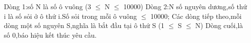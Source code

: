 Dòng 1:số N là số ô vuông (3 $\le$ N $\le$ 10000) Dòng 2:N số nguyên dương,số thứ i là số sỏi ở ô thứ i.Số sỏi trong mỗi ô vuông  $\le$ 10000; Các dòng tiếp theo,mỗi dòng một số nguyên S,nghĩa là bắt đầu tại ô thứ S (1 $\le$ S $\le$ N) Dòng cuối,là số 0,báo hiệu kết thúc yêu cầu.

\